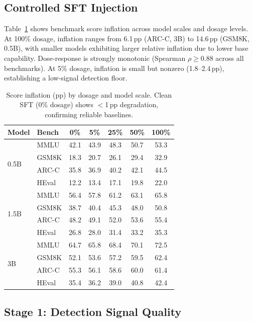 \documentclass[letterpaper,11pt]{article}
\begin{document}
\subsection{Controlled SFT Injection}
\label{sec:sft_injection}

Table~\ref{tab:inflation} shows benchmark score inflation across model scales and dosage levels. At 100\% dosage, inflation ranges from 6.1\,pp (ARC-C, 3B) to 14.6\,pp (GSM8K, 0.5B), with smaller models exhibiting larger relative inflation due to lower base capability. Dose-response is strongly monotonic (Spearman $\rho \geq 0.88$ across all benchmarks). At 5\% dosage, inflation is small but nonzero (1.8--2.4\,pp), establishing a low-signal detection floor.

\begin{table}[t]
\centering
\caption{Score inflation (pp) by dosage and model scale. Clean SFT (0\% dosage) shows $<$1\,pp degradation, confirming reliable baselines.}
\label{tab:inflation}
\small
\begin{tabular}{llccccc}
\toprule
Model & Bench & 0\% & 5\% & 25\% & 50\% & 100\% \\
\midrule
\multirow{4}{*}{0.5B} & MMLU & 42.1 & 43.9 & 48.3 & 50.7 & 53.3 \\
 & GSM8K & 18.3 & 20.7 & 26.1 & 29.4 & 32.9 \\
 & ARC-C & 35.8 & 36.9 & 40.2 & 42.1 & 44.5 \\
 & HEval & 12.2 & 13.4 & 17.1 & 19.8 & 22.0 \\
\midrule
\multirow{4}{*}{1.5B} & MMLU & 56.4 & 57.8 & 61.2 & 63.1 & 65.8 \\
 & GSM8K & 38.7 & 40.4 & 45.3 & 48.0 & 50.8 \\
 & ARC-C & 48.2 & 49.1 & 52.0 & 53.6 & 55.4 \\
 & HEval & 26.8 & 28.0 & 31.4 & 33.2 & 35.3 \\
\midrule
\multirow{4}{*}{3B} & MMLU & 64.7 & 65.8 & 68.4 & 70.1 & 72.5 \\
 & GSM8K & 52.1 & 53.6 & 57.2 & 59.5 & 62.4 \\
 & ARC-C & 55.3 & 56.1 & 58.6 & 60.0 & 61.4 \\
 & HEval & 35.4 & 36.2 & 39.0 & 40.8 & 42.4 \\
\bottomrule
\end{tabular}
\end{table}

\subsection{Stage 1: Detection Signal Quality}
\label{sec:signal_quality}
\end{document}
